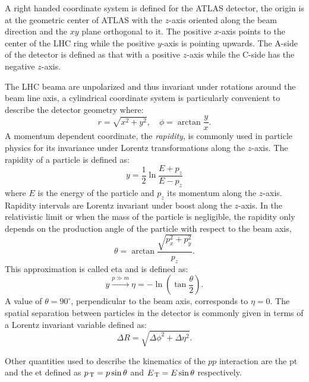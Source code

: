 A right handed coordinate system is defined for the ATLAS detector, the origin
is at the geometric center of ATLAS with the $z$-axis oriented along the beam
direction and the $xy$ plane orthogonal to it. The positive $x$-axis points to
the center of the LHC ring while the positive $y$-axis is pointing upwards. The
A-side of the detector is defined as that with a positive $z$-axis while the
C-side has the negative $z$-axis.

The LHC beama are unpolarized and thus invariant under rotations around the beam
line axis, a cylindrical coordinate system is particularly convenient to
describe the detector geometry where:
\begin{equation}
  \label{eq:73}
  r = \sqrt{x^2 + y^2}, \quad \phi = \arctan \frac{y}{x}.
\end{equation}
A momentum dependent coordinate, the \emph{rapidity}, is commonly used in
particle physics for its invariance under Lorentz transformations along the
$z$-axis. The rapidity of a particle is defined as:
\begin{equation}
  \label{eq:74}
  y = \frac{1}{2} \ln \frac{E + p_z}{E - p_z}
\end{equation}
where $E$ is the energy of the particle and $p_z$ its momentum along the
$z$-axis. Rapidity intervals are Lorentz invariant under boost along the
$z$-axis. In the relativistic limit or when the mass of the particle is
negligible, the rapidity only depends on the production angle of the particle
with respect to the beam axis,
\begin{equation}
  \label{eq:75}
  \theta = \arctan \frac{\sqrt{p_x^2 + p_y^2}}{p_z}.
\end{equation}
This approximation is called \gls{eta} and is defined as:
\begin{equation}
  \label{eq:76}
  y \xrightarrow{p \gg m} \eta = - \ln \left( \tan \frac{\theta}{2} \right).
\end{equation}
A value of $\theta = 90^{\circ}$, perpendicular to the beam axis, corresponds to
$\eta = 0$. The spatial separation between particles in the detector is commonly
given in terms of a Lorentz invariant variable defined as:
\begin{equation}
  \label{eq:77}
  \Delta R = \sqrt{\Delta \phi^2 + \Delta \eta^2}.
\end{equation}

Other quantities used to describe the kinematics of the $pp$ interaction are the
\gls{pt} and the \gls{et} defined as $p_\mathrm{\, T} = p \sin \theta$ and
$E_\mathrm{\, T} = E \sin \theta$ respectively.
